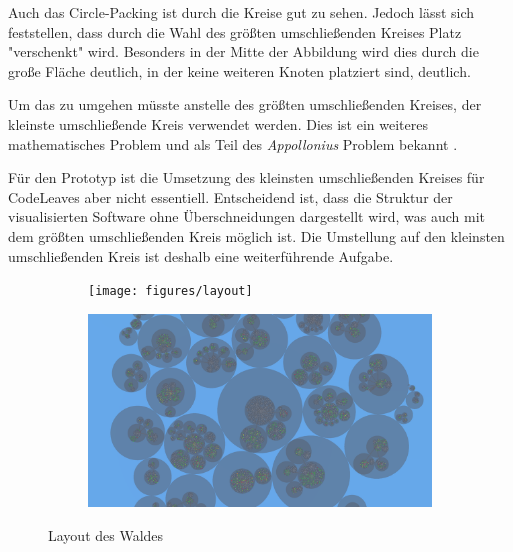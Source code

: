 %

Auch das Circle-Packing ist durch die Kreise gut zu sehen. Jedoch lässt sich feststellen, dass durch die Wahl des größten umschließenden Kreises Platz "verschenkt" wird. Besonders in der Mitte der Abbildung wird dies durch die große Fläche deutlich, in der keine weiteren Knoten platziert sind, deutlich.

Um das zu umgehen müsste anstelle des größten umschließenden Kreises, der kleinste umschließende Kreis verwendet werden. Dies ist ein weiteres mathematisches Problem und als Teil des \textit{Appollonius} Problem bekannt \cite{dergiades2007soddy}.

Für den Prototyp ist die Umsetzung des kleinsten umschließenden Kreises für CodeLeaves aber nicht essentiell. Entscheidend ist, dass die Struktur der visualisierten Software ohne Überschneidungen dargestellt wird, was auch mit dem größten umschließenden Kreis möglich ist. Die Umstellung auf den kleinsten umschließenden Kreis ist deshalb eine weiterführende Aufgabe.

\begin{figure}[htbp]
  \centering
  \begin{subfigure}[t]{\textwidth}
    \centering
    \texttt{[image: figures/layout]}
     \label{fig:layout-side}
  \end{subfigure}
  \par\bigskip
  \begin{subfigure}[t]{\textwidth}
    \centering
  	\includegraphics[width=\textwidth]{figures/circle-packing}
  	 \label{fig:layout-top}
  \end{subfigure}
  \caption{Layout des Waldes} \label{fig:layout}
\end{figure}

